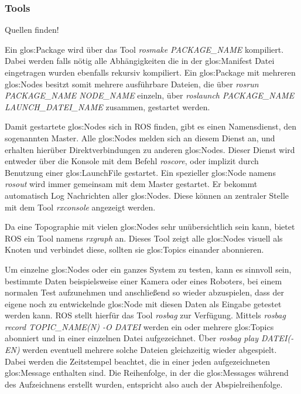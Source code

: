 \subsubsection{Tools}

{\color{red}Quellen finden!}

Ein \gls{glos:Package} wird über das Tool \emph{rosmake PACKAGE\_NAME} kompiliert. Dabei werden falls nötig alle Abhängigkeiten die in der \gls{glos:Manifest} Datei eingetragen wurden ebenfalls rekursiv kompiliert. Ein \gls{glos:Package} mit mehreren \glspl{glos:Node} besitzt somit mehrere ausführbare Dateien, die über \emph{rosrun PACKAGE\_NAME NODE\_NAME} einzeln, über \emph{roslaunch PACKAGE\_NAME LAUNCH\_DATEI\_NAME} zusammen, gestartet werden.

Damit gestartete \glspl{glos:Node} sich in \gls{ROS} finden, gibt es einen Namensdienst, den sogenannten Master. Alle \glspl{glos:Node} melden sich an diesem Dienst an, und erhalten hierüber Direktverbindungen zu anderen \glspl{glos:Node}. Dieser Dienst wird entweder über die Konsole mit dem Befehl \emph{roscore}, oder implizit durch Benutzung einer \gls{glos:LaunchFile} gestartet. Ein spezieller \gls{glos:Node} namens \emph{rosout} wird immer gemeinsam mit dem Master gestartet. Er bekommt automatisch Log Nachrichten aller \glspl{glos:Node}. Diese können an zentraler Stelle mit dem Tool \emph{rxconsole} angezeigt werden.

Da eine Topographie mit vielen \glspl{glos:Node} sehr unübersichtlich sein kann, bietet \gls{ROS} ein Tool namens \emph{rxgraph} an. Dieses Tool zeigt alle \glspl{glos:Node} visuell als Knoten und verbindet diese, sollten sie \glspl{glos:Topic} einander abonnieren.

Um einzelne \glspl{glos:Node} oder ein ganzes System zu testen, kann es sinnvoll sein, bestimmte Daten beispielsweise einer Kamera oder eines Roboters, bei einem normalen Test aufzunehmen und anschließend so wieder abzuspielen, dass der eigene noch zu entwickelnde \gls{glos:Node} mit diesen Daten als Eingabe getestet werden kann. \gls{ROS} stellt hierfür das Tool \emph{rosbag} zur Verfügung. Mittels \emph{rosbag record TOPIC\_NAME(N) -O DATEI} werden ein oder mehrere \glspl{glos:Topic} abonniert und in einer einzelnen Datei aufgezeichnet. Über \emph{rosbag play DATEI(-EN)} werden eventuell mehrere solche Dateien gleichzeitig wieder abgespielt. Dabei werden die Zeitstempel beachtet, die in einer jeden aufgezeichneten \gls{glos:Message} enthalten sind. Die Reihenfolge, in der die \glspl{glos:Message} während des Aufzeichnens erstellt wurden, entspricht also auch der Abspielreihenfolge.

